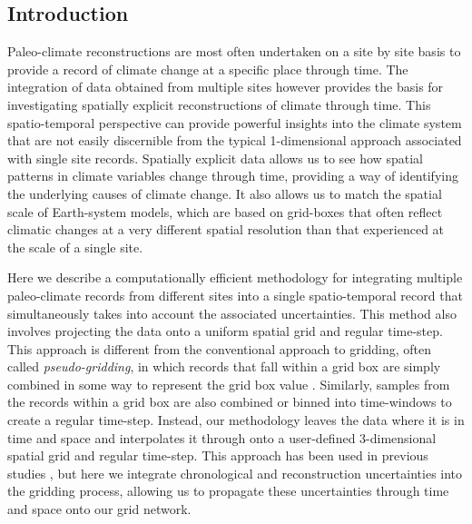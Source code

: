 

\label{chp:gridding}

\begin{refsection}


\section{Introduction}  \label{sec:gridding-intro}

Paleo-climate reconstructions are most often undertaken on a site by site basis to provide a record of climate change at a specific place through time. The integration of data obtained from multiple sites however provides the basis for investigating spatially explicit reconstructions of climate through time. This spatio-temporal perspective can provide powerful insights into the climate system that are not easily discernible from the typical 1-dimensional approach associated with single site records. Spatially explicit data allows us to see how spatial patterns in climate variables change through time, providing a way of identifying the underlying causes of climate change. It also allows us to match the spatial scale of Earth-system models, which are based on grid-boxes that often reflect climatic changes at a very different spatial resolution than that experienced at the scale of a single site.

Here we describe a computationally efficient methodology for integrating multiple paleo-climate records from different sites into a single spatio-temporal record that simultaneously takes into account the associated uncertainties. This method also involves projecting the data onto a uniform spatial grid and regular time-step. This approach is different from the conventional approach to gridding, often called \textit{pseudo-gridding}, in which records that fall within a grid box are simply combined in some way to represent the grid box value \citep[e.g.][]{BartleinHarrisonBrewerEtAl2010, MarsicekShumanBartleinEtAl2018, MarcottShakunClarkEtAl2013, WaelbroeckPaulKuceraEtAl2009}. Similarly, samples from the records within a grid box are also combined or binned into time-windows to create a regular time-step. Instead, our methodology leaves the data where it is in time and space and interpolates it through onto a user-defined 3-dimensional spatial grid and regular time-step. This approach has been used in previous studies \citep{DavisBrewerStevensonEtAl2003, MauriDavisCollinsEtAl2014, MauriDavisCollinsEtAl2015}, but here we integrate chronological and reconstruction uncertainties into the gridding process, allowing us to propagate these uncertainties through time and space onto our grid network. 


\end{refsection}
